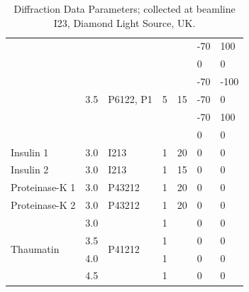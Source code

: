 \begin{table}[]
{\begin{tabular}{@{}lllllll@{}}
                           &                      &                           &                    &                    & -70   & 100  \\ \cmidrule(l){2-7} 
                                & \multirow{5}{*}{3.5} & \multirow{5}{*}{P6122, P1} & \multirow{5}{*}{5} & \multirow{5}{*}{15} & 0   & 0    \\
                           &                      &                           &                    &                    & -70   & -100 \\
                           &                      &                           &                    &                    & -70   & 0    \\
                           &                      &                           &                    &                    & -70   & 100  \\
                           &                      &                           &                    &                    & 0     & 0    \\ \midrule
Insulin 1                  & 3.0                  & I213                      & 1                  & 20                 & 0     & 0    \\ \midrule
Insulin 2                  & 3.0                  & I213                      & 1                  & 15                 & 0     & 0    \\ \midrule
Proteinase-K 1             & 3.0                  & P43212                    & 1                  & 20                 & 0     & 0    \\ \midrule
Proteinase-K 2             & 3.0                  & P43212                    & 1                  & 20                 & 0     & 0    \\ \midrule
\multirow{4}{*}{Thaumatin} & 3.0                  & \multirow{4}{*}{P41212}   & 1                  &                    & 0     & 0    \\
                           & 3.5                  &                           & 1                  &                    & 0     & 0    \\
                           & 4.0                  &                           & 1                  &                    & 0     & 0    \\
                           & 4.5                  &                           & 1                  &                    & 0     & 0    \\ \bottomrule
\end{tabular}%
}
\caption{Diffraction Data Parameters; collected at beamline I23, Diamond Light Source, UK.}
\label{diffration_table}
\end{table}

